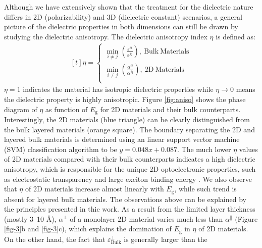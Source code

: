\documentclass[journal=ancac3,manuscript=article,email=true,hyperref=true,keywords=false]{achemso}
\begin{document}
Although we have extensively shown that the treatment for the
dielectric nature differs in 2D (polarizability) and 3D (dielectric
constant) scenarios, a general picture of the dielectric properties in
both dimensions can still be drawn by studying the dielectric
anisotropy. The dielectric anisotropy index $\eta$ is defined as:
\begin{equation}
  \label{eq:anisotropy}
  \begin{aligned}[t]
    \eta =
    \begin{cases}
      {\displaystyle \min_{i \neq j}}
      {\displaystyle
        \left(\frac{\varepsilon^{ii}}{\varepsilon^{jj}}\right)},
      \ \mathrm{Bulk\ Materials}\\
      {\displaystyle \min_{i \neq j}}
      {\displaystyle
        \left(\frac{\alpha^{ii}}{\alpha^{jj}}\right)},
      \ \mathrm{2D\ Materials}\\
    \end{cases}
  \end{aligned}
\end{equation}
$\eta=1$ indicates the material has isotropic dielectric properties
while $\eta \to 0$ means the dielectric property is highly
anisotropic. Figure \ref{fig:aniso} shows the phase diagram of $\eta$
as function of $E_{\mathrm{g}}$ for 2D materials and their bulk
counterparts. Interestingly, the 2D materials (blue triangle) can be
clearly distinguished from the bulk layered materials (orange
square). The boundary separating the 2D and layered bulk materials is
determined using an linear support vector machine (SVM) classification
algorithm to be $y=0.048x+0.087$. The much lower $\eta$ values of 2D
materials compared with their bulk counterparts indicates a high
dielectric anisotropy, which is responsible for the unique 2D
optoelectronic properties, such as electrostatic transparency
\cite{Liluhua_2014,Tian_2016,Li_2018} and large exciton binding energy
\cite{Pulci_2014,Tran_2014,Chernikov_2014_EB_MoS2_2D3D,Berkelbach_2013}. We
also observe that $\eta$ of 2D materials increase almost linearly with
$E_{\mathrm{g}}$, while such trend is absent for layered bulk
materials. The observations above can be explained by the principles
presented in thie work. As a result from the limited layer thickness
(mostly 3--10 \AA{}), $\alpha^{\perp}$ of a monolayer 2D material
varies much less than $\alpha^{\parallel}$ (Figure \ref{fig-3}b and
\ref{fig-3}c), which explains the domination of $E_{\mathrm{g}}$ in
$\eta$ of 2D materials. On the other hand, the fact that
$\varepsilon^{\perp}_{\mathrm{Bulk}}$ is generally larger than the
\end{document}
